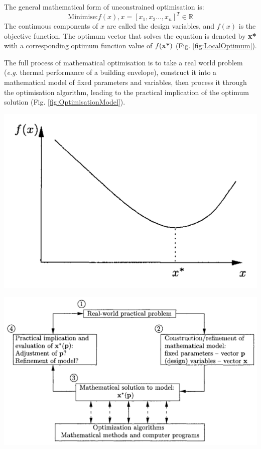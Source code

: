 \documentclass[11pt,a4paper,oneside]{article}
\newenvironment{Figure}		%
	{\par\medskip\noindent\minipage{\linewidth}}
	{\endminipage\par\medskip}
\begin{document}
\begin{multicols}{2}
The general mathematical form of unconstrained optimisation is:\\
\begin{equation}
\text{Minimise:} f(x), x=[x_1,x_2\dots,x_n]^T \in \mathbb{R}
\end{equation}
The continuous components of $x$ are called the design variables, and $f(x)$ is the objective function. The optimum vector that solves the equation is denoted by \textbf{x*} with a corresponding optimum function value of $f(\text{\textbf{x*}})$ (Fig. \ref{fig:LocalOptimum}).

The full process of mathematical optimisation is to take a real world problem (\emph{e.g.} thermal performance of a building envelope), construct it into a mathematical model of fixed parameters and variables, then process it through the optimisation algorithm, leading to the practical implication of the optimum solution (Fig. \ref{fig:OptimisationModel}).

\begin{Figure}
	\includegraphics[width=\linewidth]{./Images/4-LocalOptimum}
	\label{fig:LocalOptimum}
\end{Figure}

\end{multicols}
\begin{Figure}
	\centering	
	\includegraphics[width=0.8\linewidth]{./Images/5-OptimisationModel}
	\label{fig:OptimisationModel}
\end{Figure}
\end{document}
